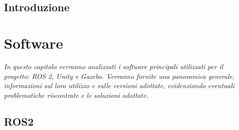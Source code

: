 \documentclass[11pt]{report}
\begin{document}
\tableofcontents
{}
\newpage

\pagestyle{plain}

\section*{Introduzione}

\newpage
\chapter{Software}
\textit{In questo capitolo verranno analizzati i software principali utilizzati per il progetto: ROS 2, Unity e Gazebo. Verranno fornite una panoramica generale, informazioni sul loro utilizzo e sulle versioni adottate, evidenziando eventuali problematiche riscontrate e le soluzioni adottate.}

\section{ROS2}
\end{document}
